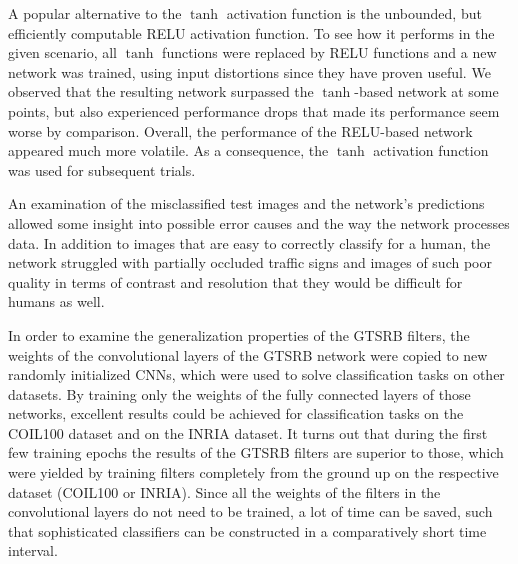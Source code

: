 \documentclass[11pt, a4paper]{article}
\begin{document}
A popular alternative to the $\tanh$ activation function is the unbounded, but efficiently computable RELU activation function. To see how it performs in the given scenario, all $\tanh$ functions were replaced by RELU functions and a new network was trained, using input distortions since they have proven useful. We observed that the resulting network surpassed the $\tanh$-based network at some points, but also experienced performance drops that made its performance seem worse by comparison. Overall, the performance of the RELU-based network appeared much more volatile. As a consequence, the $\tanh$ activation function was used for subsequent trials.

An examination of the misclassified test images and the network's predictions allowed some insight into possible error causes and the way the network processes data. In addition to images that are easy to correctly classify for a human, the network struggled with partially occluded traffic signs and images of such poor quality in terms of contrast and resolution that they would be difficult for humans as well.

In order to examine the generalization properties of the GTSRB filters, the weights of the convolutional layers of the GTSRB network were copied to new randomly initialized CNNs, which were used to solve classification tasks on other datasets. By training only the weights of the fully connected layers of those networks, excellent results could be achieved for classification tasks on the COIL100 dataset and on the INRIA dataset. It turns out that during the first few training epochs the results of the GTSRB filters are superior to those, which were yielded by training filters completely from the ground up on the respective dataset (COIL100 or INRIA). Since all the weights of the filters in the convolutional layers do not need to be trained, a lot of time can be saved, such that sophisticated classifiers can be constructed in a comparatively short time interval.
\end{document}
